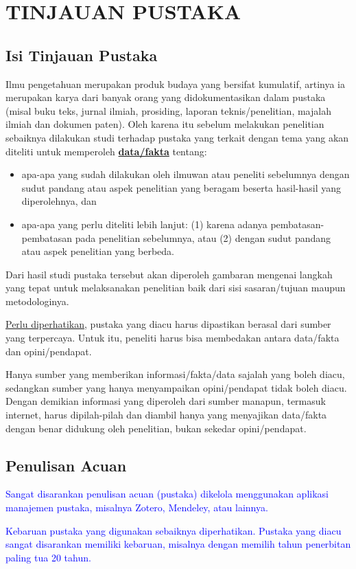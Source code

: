 \chapter{TINJAUAN PUSTAKA}
\label{pustaka}

\section{Isi Tinjauan Pustaka}
Ilmu pengetahuan merupakan produk budaya yang bersifat kumulatif, artinya ia merupakan karya dari banyak orang yang didokumentasikan dalam pustaka (misal buku teks, jurnal ilmiah, prosiding, laporan teknis/penelitian, majalah ilmiah dan dokumen paten). Oleh karena itu sebelum melakukan penelitian sebaiknya dilakukan studi terhadap pustaka yang terkait dengan tema yang akan diteliti untuk memperoleh \underline{\textbf{data/fakta}} tentang:

\begin{itemize}
    \item apa-apa yang sudah dilakukan oleh ilmuwan atau peneliti sebelumnya dengan sudut pandang atau aspek penelitian yang beragam beserta hasil-hasil yang diperolehnya, dan
\item apa-apa yang perlu diteliti lebih lanjut: (1) karena adanya pembatasan-pembatasan pada penelitian sebelumnya, atau (2) dengan sudut pandang atau aspek penelitian yang berbeda.
\end{itemize}



Dari hasil studi pustaka tersebut akan diperoleh gambaran mengenai langkah yang tepat untuk melaksanakan penelitian baik dari sisi sasaran/tujuan maupun metodologinya.

\underline{Perlu diperhatikan}, pustaka yang diacu harus dipastikan berasal dari sumber yang terpercaya. Untuk itu, peneliti harus bisa membedakan antara data/fakta dan opini/pendapat.

Hanya sumber yang memberikan informasi/fakta/data sajalah yang boleh diacu, sedangkan sumber yang hanya menyampaikan opini/pendapat tidak boleh diacu. Dengan demikian informasi yang diperoleh dari sumber manapun, termasuk internet, harus dipilah-pilah dan diambil hanya yang menyajikan data/fakta dengan benar didukung oleh penelitian, bukan sekedar opini/pendapat.

\section{Penulisan Acuan}
\textcolor{blue}{Sangat disarankan penulisan acuan (pustaka) dikelola menggunakan aplikasi manajemen pustaka, misalnya Zotero, Mendeley, atau lainnya.}

\textcolor{blue}{Kebaruan pustaka yang digunakan sebaiknya diperhatikan. Pustaka yang diacu sangat disarankan memiliki kebaruan, misalnya dengan memilih tahun penerbitan paling tua 20 tahun.}